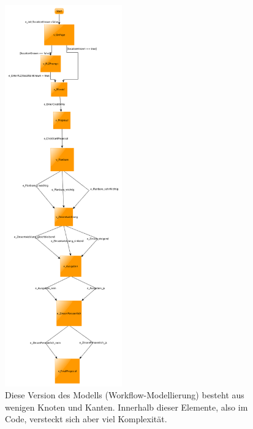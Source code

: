 \begin{figure} 
  \centering
     \includegraphics[width=0.45\textwidth]{figures/modell_abstract.png}
  \caption{Diese Version des Modells (Workflow-Modellierung) besteht aus wenigen Knoten und Kanten. Innerhalb dieser Elemente, also im Code, versteckt sich aber viel Komplexität.}
  \label{fig:modell_abstract}
\end{figure}

